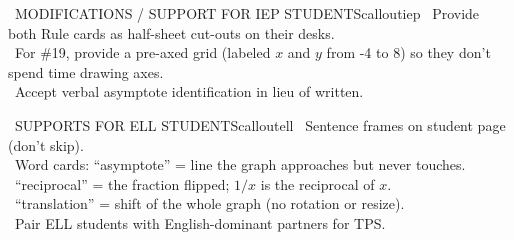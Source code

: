\documentclass[11pt]{article}
\begin{document}
\begin{callout}{\IconPuzzle\ MODIFICATIONS / SUPPORT FOR IEP STUDENTS}{calloutiep}
\textbullet\ Provide both Rule cards as half-sheet cut-outs on their desks.\\
\textbullet\ For \#19, provide a pre-axed grid (labeled \(x\) and \(y\) from -4 to 8) so they don't spend time drawing axes.\\
\textbullet\ Accept verbal asymptote identification in lieu of written.
\end{callout}

\begin{callout}{\IconGlobe\ SUPPORTS FOR ELL STUDENTS}{calloutell}
\textbullet\ Sentence frames on student page (don't skip).\\
\textbullet\ Word cards: ``asymptote'' = line the graph approaches but never touches.\\
\textbullet\ ``reciprocal'' = the fraction flipped; \(1/x\) is the reciprocal of \(x\).\\
\textbullet\ ``translation'' = shift of the whole graph (no rotation or resize).\\
\textbullet\ Pair ELL students with English-dominant partners for TPS.
\end{callout}
\end{document}
